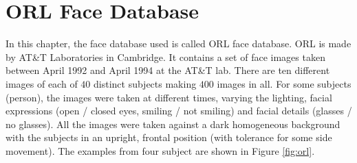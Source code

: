 \section{ORL Face Database}
In this chapter, the face database used is called ORL face database. ORL is made by AT\&T Laboratories in Cambridge. It contains a set of face images taken between April 1992 and April 1994 at the AT\&T lab. There are ten different images of each of $40$ distinct subjects making $400$ images in all. For some subjects (person), the images were taken at different times, varying the lighting, facial expressions (open / closed eyes, smiling / not smiling) and facial details (glasses / no glasses). All the images were taken against a dark homogeneous background with the subjects in an upright, frontal position (with tolerance for some side movement). The examples from four subject are shown in \mbox{Figure} \ref{fig:orl}. 
